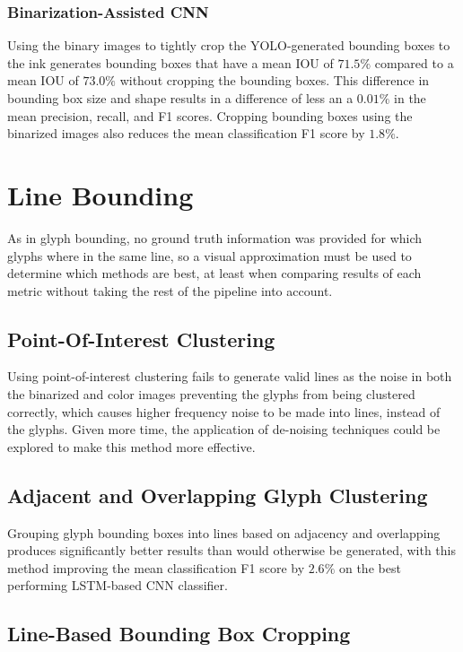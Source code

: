 \subsubsection{Binarization-Assisted CNN}
Using the binary images to tightly crop the YOLO-generated bounding boxes to the ink generates bounding boxes that have a mean IOU of $71.5\%$ compared to a mean IOU of $73.0\%$ without cropping the bounding boxes. This difference in bounding box size and shape results in a difference of less an a $0.01\%$ in the mean precision, recall, and F1 scores. Cropping bounding boxes using the binarized images also reduces the mean classification F1 score by $1.8\%$.

\section{Line Bounding}

As in glyph bounding, no ground truth information was provided for which glyphs where in the same line, so a visual approximation must be used to determine which methods are best, at least when comparing results of each metric without taking the rest of the pipeline into account.

\subsection{Point-Of-Interest Clustering}

Using point-of-interest clustering fails to generate valid lines as the noise in both the binarized and color images preventing the glyphs from being clustered correctly, which causes higher frequency noise to be made into lines, instead of the glyphs. Given more time, the application of de-noising techniques could be explored to make this method more effective.

\subsection{Adjacent and Overlapping Glyph Clustering}

Grouping glyph bounding boxes into lines based on adjacency and overlapping produces significantly better results than would otherwise be generated, with this method improving the mean classification F1 score by $2.6\%$ on the best performing LSTM-based CNN classifier.

\subsection{Line-Based Bounding Box Cropping}

